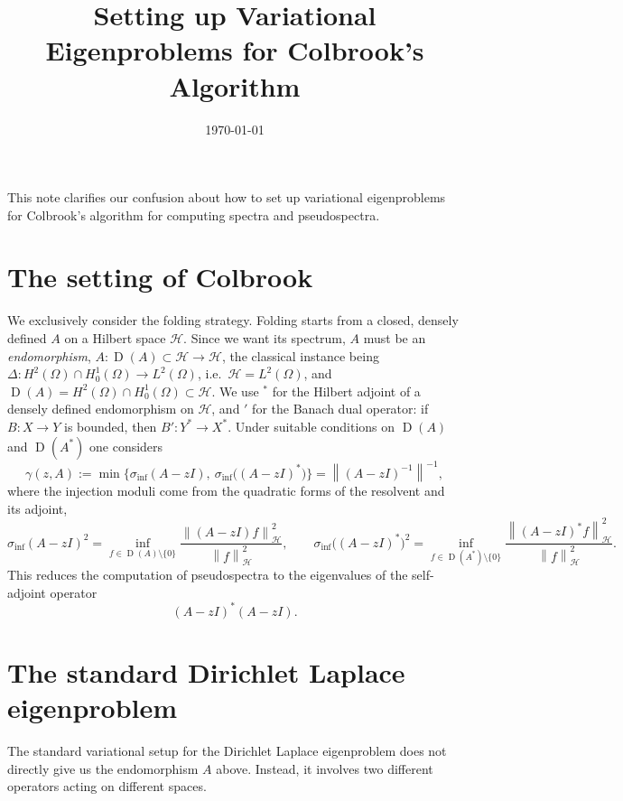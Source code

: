 \documentclass[11pt,a4paper]{article}
\title{Setting up Variational Eigenproblems for Colbrook's Algorithm}
\author{}
\date{\today}
\newcommand{\Hb}{\mathcal{H}}
\newcommand{\norm}[1]{\left\|#1\right\|}
\DeclareMathOperator{\dom}{D}
\newcommand{\siginf}{\sigma_{\inf}}
\begin{document}
\maketitle

This note clarifies our confusion about how to set up variational eigenproblems for Colbrook's algorithm for computing spectra and pseudospectra.

\section{The setting of Colbrook}

We exclusively consider the folding strategy.
Folding starts from a closed, densely defined $A$ on a Hilbert space $\Hb$.
Since we want its spectrum, $A$ must be an \emph{endomorphism}, $A \colon
\dom(A) \subset \Hb \to \Hb$, the classical instance being $\Delta \colon
H^2(\Omega) \cap H^1_0(\Omega) \to L^2(\Omega)$, i.e.~$\Hb = L^2(\Omega)$, and
$\dom(A) = H^2(\Omega) \cap H^1_0(\Omega) \subset \Hb$.
We use \({}^*\) for the Hilbert adjoint of a densely defined endomorphism on
$\Hb$, and \({}'\) for the Banach dual operator:
if $B:X\to Y$ is bounded, then $B':Y^*\to X^*$. Under suitable conditions on
$\dom(A)$ and $\dom(A^*)$ one considers
\begin{equation}
  \gamma(z,A) := \min\bigl\{\siginf(A - zI),\ \siginf\bigl((A-zI)^*\bigr)\bigr\}
    = \norm{(A-zI)^{-1}}^{-1},
\end{equation}
where the injection moduli come from the quadratic forms of the resolvent and
its adjoint,
\begin{equation}
  \siginf(A - zI)^2 = \inf_{f \in \dom(A)\setminus\{0\}}
     \frac{\norm{(A-zI)f}_{\Hb}^2}{\norm{f}_{\Hb}^2},
  \qquad
  \siginf\bigl((A-zI)^*\bigr)^2 = \inf_{f \in \dom(A^*)\setminus\{0\}}
     \frac{\norm{(A-zI)^*f}_{\Hb}^2}{\norm{f}_{\Hb}^2} .
\end{equation}
This reduces the computation of pseudospectra to the eigenvalues of the self-adjoint operator
\begin{equation}
  (A - zI)^*(A - zI).
\end{equation}

\section{The standard Dirichlet Laplace eigenproblem}

The standard variational setup for the Dirichlet Laplace eigenproblem does not directly give us the endomorphism $A$ above. Instead, it involves two different operators acting on different spaces.
\end{document}
